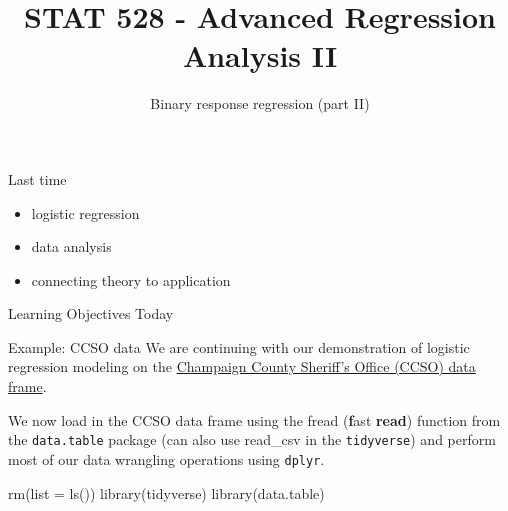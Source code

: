 \documentclass[
  ignorenonframetext,
]{beamer}
\title{STAT 528 - Advanced Regression Analysis II}
\author{Binary response regression (part II)}
\date{}
\institute{Daniel J. Eck\\
Department of Statistics\\
University of Illinois}
\newenvironment{Shaded}{\begin{snugshade}}{\end{snugshade}}
\newcommand{\AttributeTok}[1]{\textcolor[rgb]{0.77,0.63,0.00}{#1}}
\newcommand{\FunctionTok}[1]{\textcolor[rgb]{0.00,0.00,0.00}{#1}}
\newcommand{\NormalTok}[1]{#1}
\providecommand{\tightlist}{%
  \setlength{\itemsep}{0pt}\setlength{\parskip}{0pt}}
\begin{document}
\frame{\titlepage}

\begin{frame}
\newcommand{\R}{\mathbb{R}}
\newcommand{\Prob}{\mathbb{P}}
\newcommand{\Proj}{\textbf{P}}
\newcommand{\Hcal}{\mathcal{H}}
\newcommand{\rootn}{\sqrt{n}}
\newcommand{\p}{\mathbf{p}}
\newcommand{\E}{\text{E}}
\newcommand{\Var}{\text{Var}}
\newcommand{\Cov}{\text{Cov}}
\newcommand{\pibf}{\bm{\pi}}
\newcommand{\logit}{\text{logit}}

\newtheorem{cor}{Corollary}
\newtheorem{lem}{Lemma}
\newtheorem{thm}{Theorem}
\newtheorem{defn}{Definition}
\newtheorem{prop}{Proposition}
\end{frame}

\begin{frame}{Last time}
\protect\hypertarget{last-time}{}
\begin{itemize}
\tightlist
\item
  logistic regression
\item
  data analysis
\item
  connecting theory to application
\end{itemize}
\end{frame}

\begin{frame}{Learning Objectives Today}
\protect\hypertarget{learning-objectives-today}{}
\end{frame}

\begin{frame}[fragile]{Example: CCSO data}
\protect\hypertarget{example-ccso-data}{}
We are continuing with our demonstration of logistic regression modeling
on the \href{https://github.com/CUHackNight/JailData}{Champaign County
Sheriff's Office (CCSO) data frame}.

\vspace{12pt}

We now load in the CCSO data frame using the fread (\textbf{f}ast
\textbf{read}) function from the \texttt{data.table} package (can also
use read\_csv in the \texttt{tidyverse}) and perform most of our data
wrangling operations using \texttt{dplyr}.

\vspace{12pt}

\begin{Shaded}
\begin{Highlighting}[]
\FunctionTok{rm}\NormalTok{(}\AttributeTok{list =} \FunctionTok{ls}\NormalTok{())}
\FunctionTok{library}\NormalTok{(tidyverse)}
\FunctionTok{library}\NormalTok{(data.table)}
\end{Highlighting}
\end{Shaded}
\end{frame}
\end{document}
